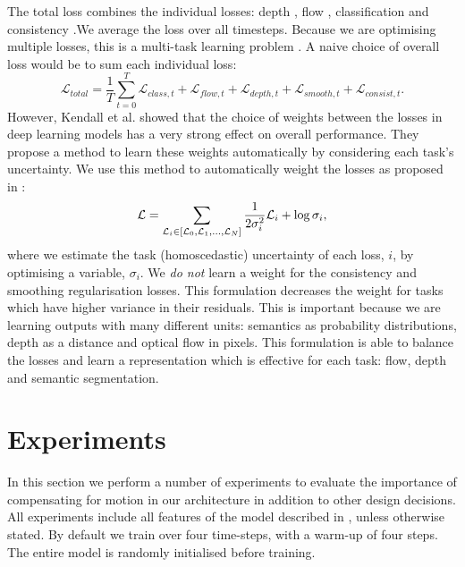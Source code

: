 The total loss combines the individual losses: depth , flow , classification and consistency .We average the loss over all timesteps. Because we are optimising multiple losses, this is a multi-task learning problem \cite{caruana1998multitask}. A naive choice of overall loss would be to sum each individual loss:
\begin{equation}
\mathcal{L}_{total} =\frac{1}{T} \sum_{t=0}^T  \mathcal{L}_{class,t} +\mathcal{L}_{flow,t} +\mathcal{L}_{depth,t} +\mathcal{L}_{smooth,t} +\mathcal{L}_{consist,t} .
\end{equation}
However, Kendall et al. \cite{kendall2017multi} showed that the choice of weights between the losses in deep learning models has a very strong effect on overall performance. They propose a method to learn these weights automatically by considering each task's uncertainty. We use this method to automatically weight the losses as proposed in \cite{kendall2017multi}:
\begin{equation}
\vspace{-1mm}
\mathcal{L} = \sum_{\mathcal{L}_i \in [\mathcal{L}_{0}, \mathcal{L}_{1}, ..., \mathcal{L}_{N}]} \frac{1}{2 \sigma_i^2} \mathcal{L}_i + \log \sigma_i,
\label{eqn:multitask}
\vspace{-1mm}
\end{equation}
where we estimate the task (homoscedastic) uncertainty of each loss, $i$, by optimising a variable, $\sigma_i$. We \textit{do not} learn a weight for the consistency and smoothing regularisation losses. This formulation decreases the weight for tasks which have higher variance in their residuals. This is important because we are learning outputs with many different units: semantics as probability distributions, depth as a distance and optical flow in pixels. This formulation is able to balance the losses and learn a representation which is effective for each task: flow, depth and semantic segmentation.



\section{Experiments}

In this section we perform a number of experiments to evaluate the importance of compensating for motion in our architecture in addition to other design decisions. All experiments include all features of the model described in , unless otherwise stated. By default we train over four time-steps, with a warm-up of four steps. The entire model is randomly initialised before training.

